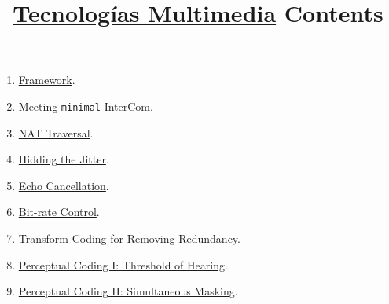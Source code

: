 
\title{\href{https://tecnologias-multimedia.github.io/}{Tecnologías Multimedia} \newline Contents}

\maketitle

\begin{enumerate}
\item \href{https://tecnologias-multimedia.github.io/contents/framework/}{Framework}.
\item \href{https://tecnologias-multimedia.github.io/contents/minimal/}{Meeting \texttt{minimal} InterCom}.
\item \href{https://tecnologias-multimedia.github.io/contents/NAT_traversal/}{NAT Traversal}.
\item \href{https://tecnologias-multimedia.github.io/contents/jitter/}{Hidding the Jitter}.
\item \href{https://tecnologias-multimedia.github.io/contents/echo_cancellation/}{Echo Cancellation}.
\item \href{https://tecnologias-multimedia.github.io/contents/BR_control/}{Bit-rate Control}.
\item \href{https://tecnologias-multimedia.github.io/contents/transform_coding/}{Transform Coding for Removing Redundancy}.
\item \href{https://tecnologias-multimedia.github.io/contents/threshold_of_hearing/}{Perceptual Coding I: Threshold of Hearing}.
\item \href{https://tecnologias-multimedia.github.io/contents/simultaneous_masking/}{Perceptual Coding II: Simultaneous Masking}.
\end{enumerate}



